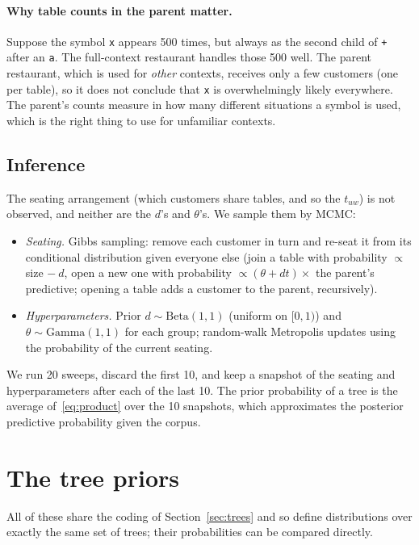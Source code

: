 \documentclass[11pt]{article}
\begin{document}
\paragraph{Why table counts in the parent matter.} Suppose the symbol \texttt{x} appears 500 times, but
always as the second child of \texttt{+} after an \texttt{a}. The full-context restaurant handles those
500 well. The parent restaurant, which is used for \emph{other} contexts, receives only a few customers
(one per table), so it does not conclude that \texttt{x} is overwhelmingly likely everywhere. The
parent's counts measure in how many different situations a symbol is used, which is the right thing to
use for unfamiliar contexts.

\subsection{Inference}\label{sec:inference}

The seating arrangement (which customers share tables, and so the $t_{uw}$) is not observed, and neither
are the $d$'s and $\theta$'s. We sample them by MCMC:
\begin{itemize}
  \item \emph{Seating.} Gibbs sampling: remove each customer in turn and re-seat it from its conditional
  distribution given everyone else (join a table with probability $\propto$ size $-\ d$, open a new one
  with probability $\propto (\theta + d t)\times$ the parent's predictive; opening a table adds a
  customer to the parent, recursively).
  \item \emph{Hyperparameters.} Prior $d \sim \mathrm{Beta}(1,1)$ (uniform on $[0,1)$) and
  $\theta \sim \mathrm{Gamma}(1,1)$ for each group; random-walk Metropolis updates using the
  probability of the current seating.
\end{itemize}
We run 20 sweeps, discard the first 10, and keep a snapshot of the seating and hyperparameters after each
of the last 10. The prior probability of a tree is the average of~\eqref{eq:product} over the 10
snapshots, which approximates the posterior predictive probability given the corpus.

\section{The tree priors}\label{sec:variants}

All of these share the coding of Section~\ref{sec:trees} and so define distributions over exactly the
same set of trees; their probabilities can be compared directly.
\end{document}
